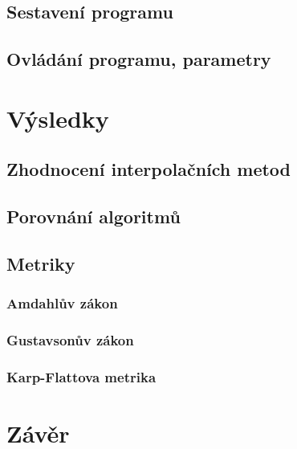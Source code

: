\documentclass[]{thesiskiv}
\begin{document}
\section{Sestavení programu}

\section{Ovládání programu, parametry}




\chapter{Výsledky}

\section{Zhodnocení interpolačních metod}

\section{Porovnání algoritmů}

\section{Metriky}

\subsection{Amdahlův zákon}

\subsection{Gustavsonův zákon}

\subsection{Karp-Flattova metrika}




\chapter{Závěr}
\end{document}
